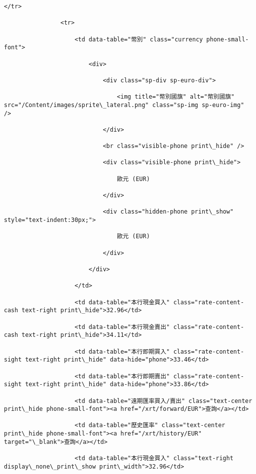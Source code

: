\documentclass[11pt]{article}
\begin{document}
\begin{Verbatim}[commandchars=\\\{\}]
                </tr>

                <tr>

                    <td data-table="幣別" class="currency phone-small-font">

                        <div>

                            <div class="sp-div sp-euro-div">

                                <img title="幣別國旗" alt="幣別國旗" src="/Content/images/sprite\_lateral.png" class="sp-img sp-euro-img" />

                            </div>

                            <br class="visible-phone print\_hide" />

                            <div class="visible-phone print\_hide">

                                歐元 (EUR)

                            </div>

                            <div class="hidden-phone print\_show" style="text-indent:30px;">

                                歐元 (EUR)

                            </div>

                        </div>

                    </td>

                    <td data-table="本行現金買入" class="rate-content-cash text-right print\_hide">32.96</td>

                    <td data-table="本行現金賣出" class="rate-content-cash text-right print\_hide">34.11</td>

                    <td data-table="本行即期買入" class="rate-content-sight text-right print\_hide" data-hide="phone">33.46</td>

                    <td data-table="本行即期賣出" class="rate-content-sight text-right print\_hide" data-hide="phone">33.86</td>

                    <td data-table="遠期匯率買入/賣出" class="text-center print\_hide phone-small-font"><a href="/xrt/forward/EUR">查詢</a></td>

                    <td data-table="歷史匯率" class="text-center print\_hide phone-small-font"><a href="/xrt/history/EUR" target="\_blank">查詢</a></td>

                    <td data-table="本行現金買入" class="text-right display\_none\_print\_show print\_width">32.96</td>


\end{Verbatim}
\end{document}
